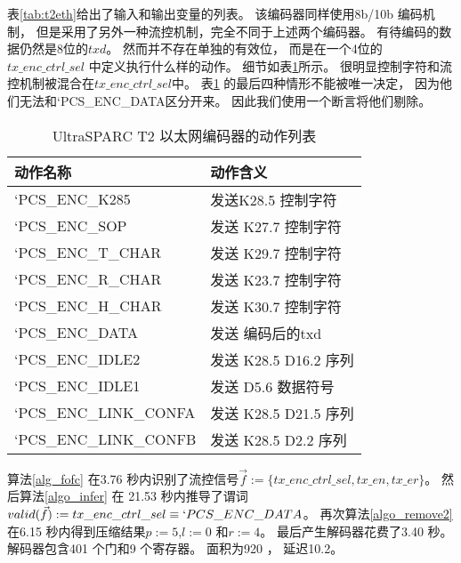 表\ref{tab:t2eth}给出了输入和输出变量的列表。
该编码器同样使用8b/10b 编码机制，
但是采用了另外一种流控机制，完全不同于上述两个编码器。
有待编码的数据仍然是8位的$txd$。
然而并不存在单独的有效位，
而是在一个4位的$tx\_enc\_ctrl\_sel$ 中定义执行什么样的动作。
细节如表\ref{tab:one}所示。
很明显控制字符和流控机制被混合在$tx\_enc\_ctrl\_sel$中。
表\ref{tab:one} 的最后四种情形不能被唯一决定，
因为他们无法和`PCS\_ENC\_DATA区分开来。
因此我们使用一个断言将他们剔除。

\begin{table}[t]%
\caption{UltraSPARC T2 以太网编码器的动作列表}
\label{tab:one}
\begin{tabular}{|l|l|}
\hline
动作名称          & 动作含义\\\hline\hline
`PCS\_ENC\_K285   & 发送K28.5 控制字符\\\hline
`PCS\_ENC\_SOP  & 发送 K27.7 控制字符\\\hline
`PCS\_ENC\_T\_CHAR    & 发送 K29.7 控制字符\\\hline
`PCS\_ENC\_R\_CHAR   & 发送 K23.7 控制字符\\\hline
`PCS\_ENC\_H\_CHAR     & 发送 K30.7 控制字符\\\hline
`PCS\_ENC\_DATA     & 发送 编码后的txd\\\hline
`PCS\_ENC\_IDLE2     & 发送 K28.5 D16.2 序列\\\hline
`PCS\_ENC\_IDLE1       & 发送 D5.6 数据符号\\\hline
`PCS\_ENC\_LINK\_CONFA & 发送  K28.5 D21.5 序列\\\hline
`PCS\_ENC\_LINK\_CONFB     & 发送 K28.5 D2.2 序列\\\hline
\end{tabular}
\end{table}%

算法\ref{alg_fofc} 在3.76 秒内识别了流控信号$\vec{f}:=\{tx\_enc\_ctrl\_sel,tx\_en, tx\_er\}$。
然后算法\ref{algo_infer} 在 21.53 秒内推导了谓词$valid(\vec{f}):=tx\_enc\_ctrl\_sel\equiv `PCS\_ENC\_DATA$。
再次算法\ref{algo_remove2} 在6.15 秒内得到压缩结果$p:=5$,$l:=0$ 和$r:=4$。
最后产生解码器花费了3.40 秒。
解码器包含401 个门和9 个寄存器。
面积为920 ，
延迟10.2。

